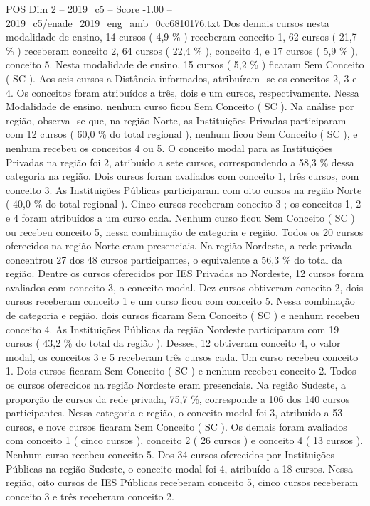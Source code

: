 \begin{textsample}{POS Dim 2 – 2019\_c5 – Score -1.00 – 2019\_c5/enade\_2019\_eng\_amb\_0cc6810176.txt}
Dos demais cursos nesta modalidade de ensino, 14 cursos ( 4,9 \% ) receberam conceito 1, 62 cursos ( 21,7 \% ) receberam conceito 2, 64 cursos ( 22,4 \% ), conceito 4, e 17 cursos ( 5,9 \% ), conceito 5.
Nesta modalidade de ensino, 15 cursos ( 5,2 \% ) ficaram Sem Conceito ( SC ).
Aos seis cursos a Distância informados, atribuíram -se os conceitos 2, 3 e 4.
Os conceitos foram atribuídos a três, dois e um cursos, respectivamente.
Nessa Modalidade de ensino, nenhum curso ficou Sem Conceito ( SC ).
Na análise por região, observa -se que, na região Norte, as Instituições Privadas participaram com 12 cursos ( 60,0 \% do total regional ), nenhum ficou Sem Conceito ( SC ), e nenhum recebeu os conceitos 4 ou 5.
O conceito modal para as Instituições Privadas na região foi 2, atribuído a sete cursos, correspondendo a 58,3 \% dessa categoria na região.
Dois cursos foram avaliados com conceito 1, três cursos, com conceito 3.
As Instituições Públicas participaram com oito cursos na região Norte ( 40,0 \% do total regional ).
Cinco cursos receberam conceito 3 ; os conceitos 1, 2 e 4 foram atribuídos a um curso cada.
Nenhum curso ficou Sem Conceito ( SC ) ou recebeu conceito 5, nessa combinação de categoria e região.
Todos os 20 cursos oferecidos na região Norte eram presenciais.
Na região Nordeste, a rede privada concentrou 27 dos 48 cursos participantes, o equivalente a 56,3 \% do total da região.
Dentre os cursos oferecidos por IES Privadas no Nordeste, 12 cursos foram avaliados com conceito 3, o conceito modal.
Dez cursos obtiveram conceito 2, dois cursos receberam conceito 1 e um curso ficou com conceito 5.
Nessa combinação de categoria e região, dois cursos ficaram Sem Conceito ( SC ) e nenhum recebeu conceito 4.
As Instituições Públicas da região Nordeste participaram com 19 cursos ( 43,2 \% do total da região ).
Desses, 12 obtiveram conceito 4, o valor modal, os conceitos 3 e 5 receberam três cursos cada.
Um curso recebeu conceito 1.
Dois cursos ficaram Sem Conceito ( SC ) e nenhum recebeu conceito 2.
Todos os cursos oferecidos na região Nordeste eram presenciais.
Na região Sudeste, a proporção de cursos da rede privada, 75,7 \%, corresponde a 106 dos 140 cursos participantes.
Nessa categoria e região, o conceito modal foi 3, atribuído a 53 cursos, e nove cursos ficaram Sem Conceito ( SC ).
Os demais foram avaliados com conceito 1 ( cinco cursos ), conceito 2 ( 26 cursos ) e conceito 4 ( 13 cursos ).
Nenhum curso recebeu conceito 5.
Dos 34 cursos oferecidos por Instituições Públicas na região Sudeste, o conceito modal foi 4, atribuído a 18 cursos.
Nessa região, oito cursos de IES Públicas receberam conceito 5, cinco cursos receberam conceito 3 e três receberam conceito 2.

\end{textsample}
